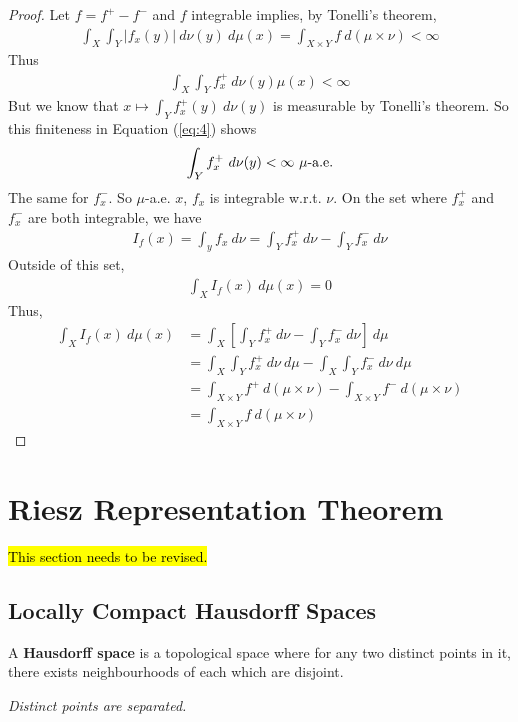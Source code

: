 \documentclass[11pt]{article}
\newcommand{\dmu}[0]{\ d\mu}
\begin{document}
\begin{theorem}
		\begin{proof}
			Let $f = f^+ - f^-$ and $f$ integrable implies, by Tonelli's theorem,
			\begin{align}
				\int_X \int_Y |f_x(y)|\ d\nu(y) \dmu(x) = \int_{X \times Y} f\ d(\mu \times \nu) < \infty \label{eq:4}
			\end{align}
			Thus
			\begin{align}
				\int_X \int_Y f_x^+\ d\nu(y)\mu(x) < \infty
			\end{align}
			But we know that $x \mapsto \int_Y f_x^+(y)\ d\nu(y)$ is measurable by Tonelli's theorem. So this finiteness in Equation (\ref{eq:4}) shows
			\begin{align}
				\int_Y f_x^+\ d\nu(y) < \infty \text{{ $\mu$-a.e.}}
			\end{align}
			The same for $f_x^-$. So $\mu$-a.e. $x$, $f_x$ is integrable w.r.t. $\nu$.
			On the set where $f_x^+$ and $f_x^-$ are both integrable, we have
			\begin{align}
				I_f(x) = \int_y f_x\ d\nu = \int_Y f_x^+\ d\nu - \int_Y f_x^-\ d\nu
			\end{align}
			Outside of this set,
			\begin{align}
				\int_X I_f(x)\dmu(x) = 0
			\end{align}
			Thus,
			\begin{align}
				\int_X I_f(x)\dmu(x) 
				&= \int_X \left[\int_Y f_x^+\ d\nu - \int_Y f_x^-\ d\nu \right]\dmu \\
				&= \int_X \int_Y f_x^+\ d\nu\dmu - \int_X \int_Y f_x^-\ d\nu \dmu \\
				&= \int_{X \times Y} f^+\ d(\mu\times \nu) - \int_{X \times Y} f^-\ d(\mu\times \nu) \\
				&= \int_{X \times Y} f\ d(\mu\times \nu)
			\end{align}
		\end{proof}
	\end{theorem}
	
	\newpage
	\section{Riesz Representation Theorem}
	\hl{This section needs to be revised.}
	\subsection{Locally Compact Hausdorff Spaces}
	\begin{definition}
		A \textbf{Hausdorff space} is a topological space where for any two distinct points in it, there exists neighbourhoods of each which are disjoint.
		
		\emph{Distinct points are separated.}
	\end{definition}
	
\end{document}
